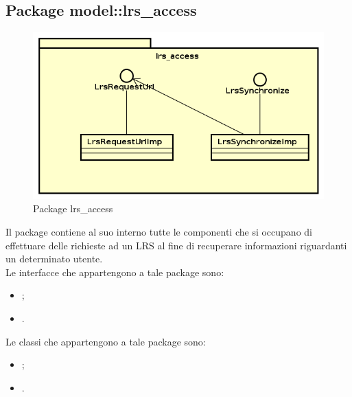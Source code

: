 \documentclass[../Tesi.tex]{subfiles}
\begin{document}
	\subsection{Package model::lrs\_access}
		\begin{figure}[H]
			\centering
			\includegraphics[scale=0.6]{images/package_diagrams/lrs_access}
				\caption{Package lrs\_access}
			\label{fig:StrutturaMVP}
		\end{figure}
		Il package  contiene al suo interno tutte le componenti che si occupano di effettuare delle richieste ad un LRS al fine di recuperare informazioni riguardanti un determinato utente. \\
		Le interfacce che appartengono a tale package sono:
		\begin{itemize}
			\item {};
			\item {}.
		\end{itemize}
		Le classi che appartengono a tale package sono:
		\begin{itemize}
			\item {};
			\item {}.
		\end{itemize}
\end{document}
